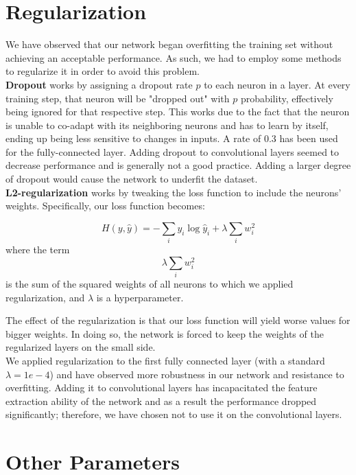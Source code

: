 \section{Regularization}
We have observed that our network began overfitting the training set without achieving an acceptable performance. As such, we had to employ some methods to regularize it in order to avoid this problem.\\
\textbf{Dropout} works by assigning a dropout rate $p$ to each neuron in a layer. At every training step, that neuron will be "dropped out" with $p$ probability, effectively being ignored for that respective step. This works due to the fact that the neuron is unable to co-adapt with its neighboring neurons and has to learn by itself, ending up being less sensitive to changes in inputs. A rate of 0.3 has been used for the fully-connected layer. Adding dropout to convolutional layers seemed to decrease performance and is generally not a good practice. Adding a larger degree of dropout would cause the network to underfit the dataset.\\
\textbf{L2-regularization} works by tweaking the loss function to include the neurons' weights. Specifically, our loss function becomes:
\begin{center}
$$H(y,\hat{y}) = - \sum_i y_i \log \hat{y}_i + \lambda \sum_{i} w_i^2$$
where the term $$\lambda \sum_{i} w_i^2$$ is the sum of the squared weights of all neurons to which we applied regularization, and $\lambda$ is a hyperparameter.
\end{center}
The effect of the regularization is that our loss function will yield worse values for bigger weights. In doing so, the network is forced to keep the weights of the regularized layers on the small side.\\
We applied regularization to the first fully connected layer (with a standard $\lambda=1e-4$) and have observed more robustness in our network and resistance to overfitting. Adding it to convolutional layers has incapacitated the feature extraction ability of the network and as a result the performance dropped significantly; therefore, we have chosen not to use it on the convolutional layers.
\section{Other Parameters}
